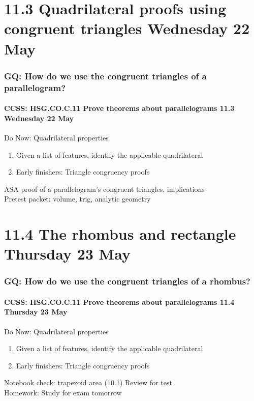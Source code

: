 \documentclass{beamer}
\begin{document}
\section{11.3 Quadrilateral proofs using congruent triangles Wednesday 22 May}
  \frame
  {
    \frametitle{GQ: How do we use the congruent triangles of a parallelogram?}
    \framesubtitle{CCSS: HSG.CO.C.11 Prove theorems about parallelograms \hfill \alert{11.3 Wednesday 22 May}}

    \begin{block}{Do Now: Quadrilateral properties}
      \begin{enumerate}
        \item Given a list of features, identify the applicable quadrilateral
        \item Early finishers: Triangle congruency proofs
      \end{enumerate}
    \end{block}
    ASA proof of a parallelogram's congruent triangles, implications\\
    Pretest packet: volume, trig, analytic geometry
  }

\section{11.4 The rhombus and rectangle Thursday 23 May}
  \frame
  {
    \frametitle{GQ: How do we use the congruent triangles of a rhombus?}
    \framesubtitle{CCSS: HSG.CO.C.11 Prove theorems about parallelograms \hfill \alert{11.4 Thursday 23 May}}

    \begin{block}{Do Now: Quadrilateral properties}
      \begin{enumerate}
        \item Given a list of features, identify the applicable quadrilateral
        \item Early finishers: Triangle congruency proofs
      \end{enumerate}
    \end{block}
    Notebook check: trapezoid area (10.1)
    Review for test\\[0.5cm]
    Homework: Study for \alert{exam tomorrow}
  }
\end{document}
